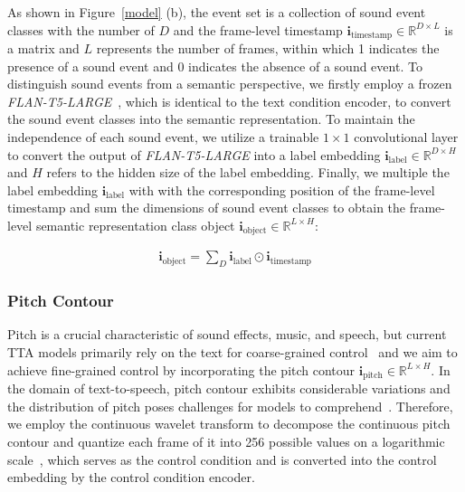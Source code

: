 \documentclass[letterpaper]{article} %
\begin{document}
As shown in Figure~\ref{model} (b), the event set is a collection of sound event classes with the number of $D$ and the frame-level timestamp $\mathbf{i}_{\text{timestamp}} \in \mathbb{R}^{D \times L}$ is a matrix and $L$ represents the number of frames, within which 1 indicates the presence of a sound event and 0 indicates the absence of a sound event. To distinguish sound events from a semantic perspective, we firstly employ a frozen \textit{FLAN-T5-LARGE}~\cite{ghosal2023tango,chung2022siflm}, which is identical to the text condition encoder, to convert the sound event classes into the semantic representation. To maintain the independence of each sound event, we utilize a trainable $1 \times 1$ convolutional layer to convert the output of \textit{FLAN-T5-LARGE} into a label embedding $\mathbf{i}_{\text{label}} \in \mathbb{R}^{D \times H}$ and $H$ refers to the hidden size of the label embedding. Finally, we multiple the label embedding $\mathbf{i}_{\text{label}}$ with with the corresponding position of the frame-level timestamp and sum the dimensions of sound event classes to obtain the frame-level semantic representation class object $\mathbf{i}_{\text{object}} \in \mathbb{R}^{L \times H}$:

\begin{align}
\mathbf{i}_{\text{object}} = \sum_{D}{\mathbf{i}_{\text{label}} \odot \mathbf{i}_{\text{timestamp}}}
\end{align}

\subsubsection{Pitch Contour} Pitch is a crucial characteristic of sound effects, music, and speech, but current TTA models primarily rely on the text for coarse-grained control~\cite{liu2023audioldm} and we aim to achieve fine-grained control by incorporating the pitch contour $\mathbf{i}_{\text{pitch}} \in \mathbb{R}^{L \times H}$. In the domain of text-to-speech, pitch contour exhibits considerable variations and the distribution of pitch poses challenges for models to comprehend~\cite{ren2021fastspeech2}. Therefore, we employ the continuous wavelet transform to decompose the continuous pitch contour and quantize each frame of it into 256 possible values on a logarithmic scale~\cite{wuni2013wavelets,ren2021fastspeech2}, which serves as the control condition and is converted into the control embedding by the control condition encoder.
\end{document}
